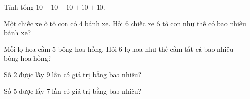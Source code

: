 \begin{ex}
Tính tổng $10 + 10 + 10 + 10 + 10$.
\end{ex}

\begin{ex}
Một chiếc xe ô tô con có 4 bánh xe. Hỏi 6 chiếc xe ô tô con như thế có bao nhiêu bánh xe?
\end{ex}

\begin{ex}
Mỗi lọ hoa cắm 5 bông hoa hồng. Hỏi 6 lọ hoa như thế cắm tất cả bao nhiêu bông hoa hồng?
\end{ex}

\begin{ex}
Số 2 được lấy 9 lần có giá trị bằng bao nhiêu?
\end{ex}

\begin{ex}
Số 5 được lấy 7 lần có giá trị bằng bao nhiêu?
\end{ex}
